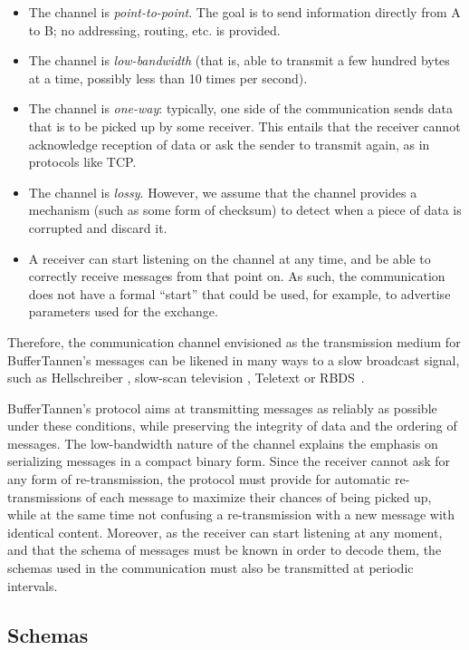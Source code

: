 \begin{itemize}
\item The channel is \emph{point-to-point}. The goal is to send information   directly from A to B; no addressing, routing, etc. is provided.
\item The channel is \emph{low-bandwidth} (that is, able to transmit a few hundred bytes at a time, possibly less than 10 times per second).
\item The channel is \emph{one-way}: typically, one side of the communication sends data that is to be picked up by some receiver. This entails that the receiver cannot acknowledge reception of data or ask the sender to transmit again, as in protocols like TCP.
\item The channel is \emph{lossy}. However, we assume that the channel provides a mechanism (such as some form of checksum) to detect when a piece of data is corrupted and discard it.
\item A receiver can start listening on the channel at any time, and be able to correctly receive messages from that point on. As such, the communication does not have a formal ``start'' that could be used, for example, to advertise parameters used for the exchange.
\end{itemize}

Therefore, the communication channel envisioned as the transmission medium for BufferTannen's messages can be likened in many ways to a slow broadcast signal, such as Hellschreiber \cite{hells}, slow-scan television \cite{slowtv}, Teletext \cite{teletext} or RBDS~\cite{rbds}.

BufferTannen's protocol aims at transmitting messages as reliably as possible under these conditions, while preserving the integrity of data and the ordering of messages. The low-bandwidth nature of the channel explains the emphasis on serializing messages in a compact binary form. Since the receiver cannot ask for any form of re-transmission, the protocol must provide for automatic re-transmissions of each message to maximize their chances of being picked up, while at the same time not confusing a re-transmission with a new message with identical content. Moreover, as the receiver can start listening at any moment, and that the schema of messages must be known in order to decode them, the schemas used in the communication must also be transmitted at periodic intervals.

\subsection{Schemas}
\setcounter{paragraph}{0}

